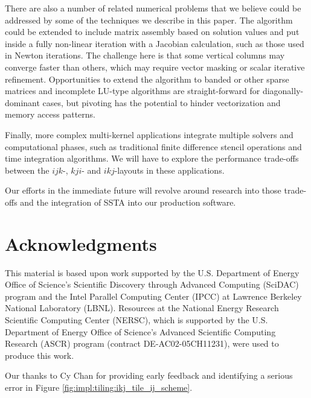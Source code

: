 \documentclass[10pt, conference, compsocconf]{IEEEtran}
\begin{document}
There are also a number of related numerical problems that we believe could be
  addressed by some of the techniques we describe in this paper.
The algorithm could be extended to include matrix assembly
  based on solution values and put inside a fully non-linear iteration
  with a Jacobian calculation, such as those used in Newton iterations.
The challenge here is that some vertical columns may converge faster than
  others, which may require vector masking or scalar iterative refinement.
Opportunities to extend the algorithm to banded or other sparse matrices
  and incomplete LU-type algorithms are straight-forward for diagonally-dominant
  cases, but pivoting has the potential to hinder vectorization and memory
  access patterns.

Finally, more complex multi-kernel applications integrate multiple solvers and
  computational phases, such as traditional finite difference
  stencil operations and time integration algorithms. 
We will have to explore the performance trade-offs between
  the \(ijk\)-, \(kji\)- and \(ikj\)-layouts in these applications.

Our efforts in the immediate future will revolve around research into those
  trade-offs and the integration of SSTA into our production software.

\section*{Acknowledgments}
\label{sec:ack}
This material is based upon work supported by the U.S. Department of Energy
  Office of Science's Scientific Discovery through Advanced Computing (SciDAC)
  program and the Intel Parallel Computing Center (IPCC) at Lawrence Berkeley
  National Laboratory (LBNL).
Resources at the National Energy Research Scientific Computing Center (NERSC),
  which is supported by the U.S. Department of Energy Office of Science's
  Advanced Scientific Computing Research (ASCR) program (contract
  DE-AC02-05CH11231), were used to produce this work.

Our thanks to Cy Chan for providing early feedback and identifying a serious
  error in Figure \ref{fig:impl:tiling:ikj_tile_ij_scheme}.

\newpage



\end{document}
